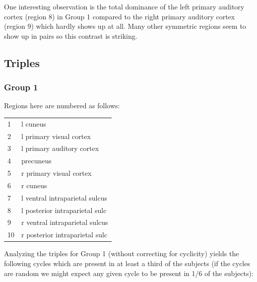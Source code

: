 \documentclass[11pt]{article}
\begin{document}
One interesting observation is the total dominance of the left primary auditory cortex (region 8) in Group 1 compared to the right primary auditory cortex (region 9) which hardly shows up at all. Many other symmetric regions seem to show up in pairs so this contrast is striking.

\subsection{Triples}
\subsubsection{Group 1}
Regions here are numbered as follows:

\vskip 10pt
\begin{center}
\begin{tabular}{ll}
1 & l cuneus \\
2 & l primary visual cortex \\
3 & l primary auditory cortex \\
4 & precuneus \\
5 & r primary visual cortex \\
6 & r cuneus \\
7 & l ventral intraparietal sulcus \\
8 & l posterior intraparietal sulc \\
9 & r ventral intraparietal sulcus \\
10 & r posterior intraparietal sulc \\
\end{tabular}
\end{center}
\vskip 10pt

Analyzing the triples for Group 1 (without correcting for cyclicity) yields the following cycles which are present in at least a third of the subjects (if the cycles are random we might expect any given cycle to be present in 1/6 of the subjects):
\end{document}
